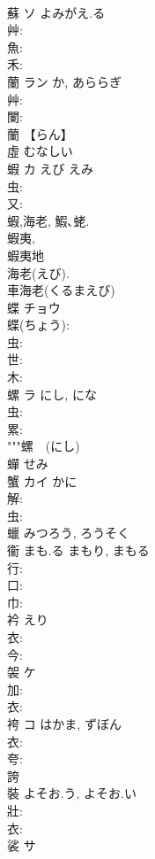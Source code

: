 \documentclass[8pt]{extreport}
\begin{document}
\begin{CJK}{UTF8}{min}
\\	蘇	ソ	よみがえ.る		
\\	艸: 
\\	魚: 
\\	禾: 
\\	蘭	ラン		か, あららぎ	
\\	艸: 
\\	闌: 
\\	蘭 【らん】
\\	虛		むなしい				
\\	蝦	カ	えび	えみ	
\\	虫: 
\\	又: 
\\	蝦,海老, 鰕､蛯. 
\\	蝦夷, 
\\	蝦夷地 
\\	海老(えび). 
\\	車海老(くるまえび) 
\\	蝶	チョウ			
\\	蝶(ちょう): 
\\	虫: 
\\	世: 
\\	木: 
\\	螺	ラ	にし, にな		
\\	虫: 
\\	累: 
\\	"""螺　(にし) 
\\	蟬		せみ				
\\	蟹	カイ	かに		
\\	解: 
\\	虫: 
\\	蠟		みつろう, ろうそく				
\\	衞		まも.る	まもり, まもる			
\\	行: 
\\	口: 
\\	巾: 
\\	衿		えり				
\\	衣: 
\\	今: 
\\	袈	ケ			
\\	加: 
\\	衣: 
\\	袴	コ	はかま, ずぼん		
\\	衣: 
\\	夸: 
\\	誇 
\\	裝		よそお.う, よそお.い				
\\	壯: 
\\	衣: 
\\	裟	サ			

\end{CJK}
\end{document}
